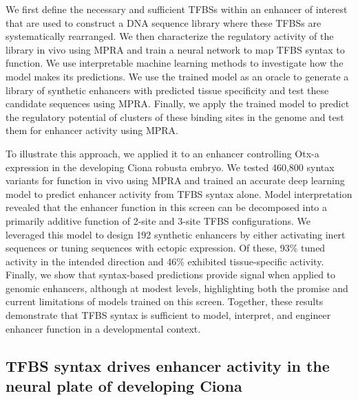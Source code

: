 We first define the necessary and sufficient TFBSs within an enhancer of interest that are used to construct a DNA sequence library where these TFBSs are systematically rearranged. 
We then characterize the regulatory activity of the library in vivo using MPRA and train a neural network to map TFBS syntax to function. 
We use interpretable machine learning methods to investigate how the model makes its predictions.
We use the trained model as an oracle to generate a library of synthetic enhancers with predicted tissue specificity and test these candidate sequences using MPRA.
Finally, we apply the trained model to predict the regulatory potential of clusters of these binding sites in the genome and test them for enhancer activity using MPRA.

To illustrate this approach, we applied it to an enhancer controlling Otx-a expression in the developing Ciona robusta embryo. We tested 460,800 syntax variants for function in vivo using MPRA and trained an accurate deep learning model to predict enhancer activity from TFBS syntax alone. Model interpretation revealed that the enhancer function in this screen can be decomposed into a primarily additive function of 2-site and 3-site TFBS configurations. We leveraged this model to design 192 synthetic enhancers by either activating inert sequences or tuning sequences with ectopic expression. Of these, 93\% tuned activity in the intended direction and 46\% exhibited tissue-specific activity. Finally, we show that syntax-based predictions provide signal when applied to genomic enhancers, although at modest levels, highlighting both the promise and current limitations of models trained on this screen. Together, these results demonstrate that TFBS syntax is sufficient to model, interpret, and engineer enhancer function in a developmental context.

\subsection{TFBS syntax drives enhancer activity in the neural plate of developing Ciona}

